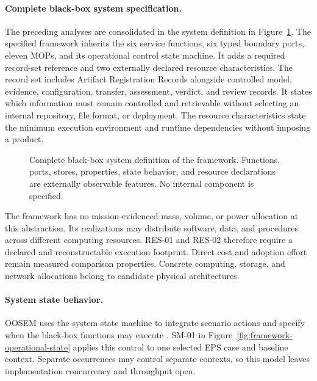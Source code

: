 \documentclass[11pt,a4paper]{article}
\begin{document}
\paragraph{Complete black-box system specification.}
The preceding analyses are consolidated in the system definition in Figure~\ref{fig:framework-black-box-specification}. The specified framework inherits the six service functions, six typed boundary ports, eleven MOPs, and its operational control state machine. It adds a required record-set reference and two externally declared resource characteristics. The record set includes Artifact Registration Records alongside controlled model, evidence, configuration, transfer, assessment, verdict, and review records. It states which information must remain controlled and retrievable without selecting an internal repository, file format, or deployment. The resource characteristics state the minimum execution environment and runtime dependencies without imposing a product.

\begin{figure}[H]
    \centering
    \resizebox{\linewidth}{!}{}
    \caption{Complete black-box system definition of the framework. Functions, ports, stores, properties, state behavior, and resource declarations are externally observable features. No internal component is specified.}
    \label{fig:framework-black-box-specification}
\end{figure}

The framework has no mission-evidenced mass, volume, or power allocation at this abstraction. Its realizations may distribute software, data, and procedures across different computing resources. RES-01 and RES-02 therefore require a declared and reconstructable execution footprint. Direct cost and adoption effort remain measured comparison properties. Concrete computing, storage, and network allocations belong to candidate physical architectures.

\paragraph{System state behavior.}
OOSEM uses the system state machine to integrate scenario actions and specify when the black-box functions may execute \citep[Sec.~17.3.3]{friedenthal2014practical}. SM-01 in Figure~\ref{fig:framework-operational-state} applies this control to one selected EPS case and baseline context. Separate occurrences may control separate contexts, so this model leaves implementation concurrency and throughput open.
\end{document}
